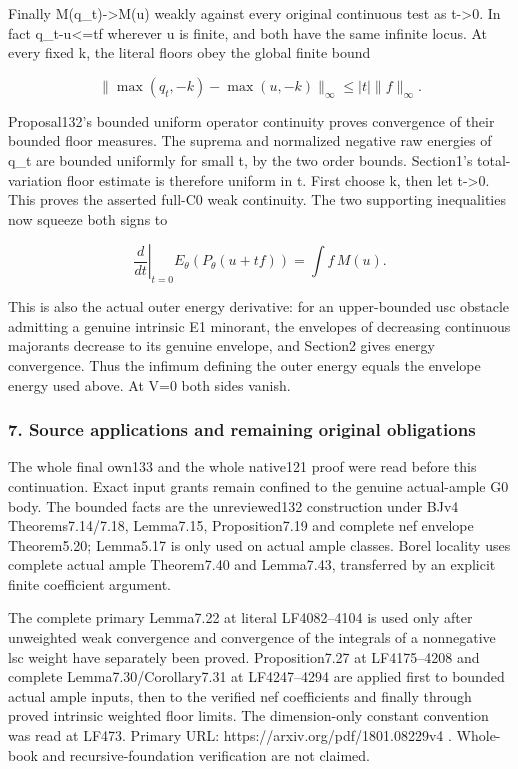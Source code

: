\documentclass[
]{article}
\begin{document}
Finally M(q\_t)-\textgreater M(u) weakly against every original
continuous test as t-\textgreater0. In fact
\textbar q\_t-u\textbar\textless=\textbar t\textbar\textbar\textbar f\textbar\textbar{}
wherever u is finite, and both have the same infinite locus. At every
fixed k, the literal floors obey the global finite bound

\[\|\max(q_t,-k)-\max(u,-k)\|_\infty\le |t|\|f\|_\infty.\]

Proposal132's bounded uniform operator continuity proves convergence of
their bounded floor measures. The suprema and normalized negative raw
energies of q\_t are bounded uniformly for small t, by the two order
bounds. Section1's total-variation floor estimate is therefore uniform
in t. First choose k, then let t-\textgreater0. This proves the asserted
full-C0 weak continuity. The two supporting inequalities now squeeze
both signs to

\[\left.\frac d{dt}\right|_{t=0}E_\theta(P_\theta(u+t f))
=\int f\,M(u).\]

This is also the actual outer energy derivative: for an upper-bounded
usc obstacle admitting a genuine intrinsic E1 minorant, the envelopes of
decreasing continuous majorants decrease to its genuine envelope, and
Section2 gives energy convergence. Thus the infimum defining the outer
energy equals the envelope energy used above. At V=0 both sides vanish.

\subsubsection{7. Source applications and remaining original
obligations}\label{source-applications-and-remaining-original-obligations}

The whole final own133 and the whole native121 proof were read before
this continuation. Exact input grants remain confined to the genuine
actual-ample G0 body. The bounded facts are the unreviewed132
construction under BJv4 Theorems7.14/7.18, Lemma7.15, Proposition7.19
and complete nef envelope Theorem5.20; Lemma5.17 is only used on actual
ample classes. Borel locality uses complete actual ample Theorem7.40 and
Lemma7.43, transferred by an explicit finite coefficient argument.

The complete primary Lemma7.22 at literal LF4082--4104 is used only
after unweighted weak convergence and convergence of the integrals of a
nonnegative lsc weight have separately been proved. Proposition7.27 at
LF4175--4208 and complete Lemma7.30/Corollary7.31 at LF4247--4294 are
applied first to bounded actual ample inputs, then to the verified nef
coefficients and finally through proved intrinsic weighted floor limits.
The dimension-only constant convention was read at LF473. Primary URL:
https://arxiv.org/pdf/1801.08229v4 . Whole-book and recursive-foundation
verification are not claimed.
\end{document}
